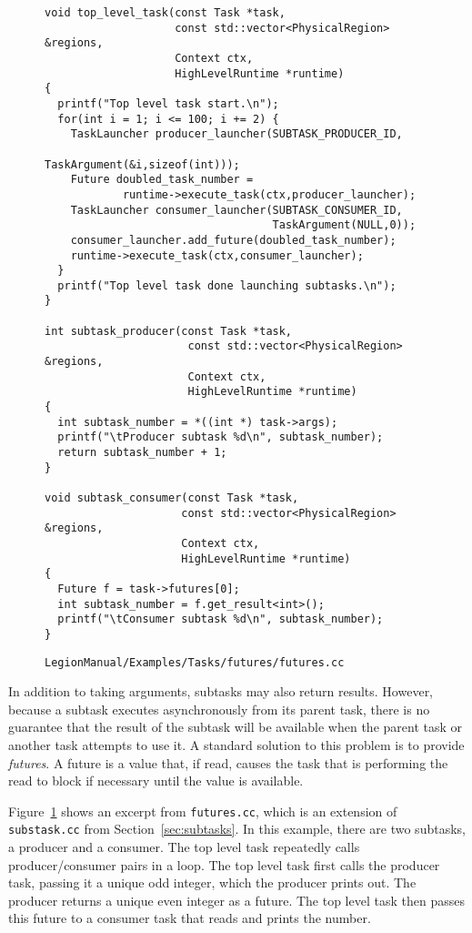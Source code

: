 \documentclass[11pt]{book}
\newcommand{\legionbook}[1]{{\tt LegionManual/Examples/#1}}
\begin{document}
\begin{figure}
\begin{lstlisting}
void top_level_task(const Task *task,
                    const std::vector<PhysicalRegion> &regions,
                    Context ctx,
                    HighLevelRuntime *runtime)
{
  printf("Top level task start.\n");
  for(int i = 1; i <= 100; i += 2) {
    TaskLauncher producer_launcher(SUBTASK_PRODUCER_ID, 
                                   TaskArgument(&i,sizeof(int)));
    Future doubled_task_number =  
            runtime->execute_task(ctx,producer_launcher);
    TaskLauncher consumer_launcher(SUBTASK_CONSUMER_ID, 
                                   TaskArgument(NULL,0));
    consumer_launcher.add_future(doubled_task_number);
    runtime->execute_task(ctx,consumer_launcher);
  }
  printf("Top level task done launching subtasks.\n");
}

int subtask_producer(const Task *task,
                      const std::vector<PhysicalRegion> &regions,
                      Context ctx,
                      HighLevelRuntime *runtime)
{
  int subtask_number = *((int *) task->args);
  printf("\tProducer subtask %d\n", subtask_number);
  return subtask_number + 1;
}

void subtask_consumer(const Task *task,
                     const std::vector<PhysicalRegion> &regions,
                     Context ctx,
                     HighLevelRuntime *runtime)
{
  Future f = task->futures[0];
  int subtask_number = f.get_result<int>();
  printf("\tConsumer subtask %d\n", subtask_number);
}
\end{lstlisting}
\caption{\legionbook{Tasks/futures/futures.cc}}
\label{fig:futures}
\end{figure}

In addition to taking arguments, subtasks may also return results.
However, because a subtask executes asynchronously from its parent
task, there is no guarantee that the result of the subtask will be
available when the parent task or another task attempts to use it.  A
standard solution to this problem is to provide {\em futures}.  A future
is a value that, if read, causes the task that is performing the
read to block if necessary until the value is available.

Figure~\ref{fig:futures} shows an excerpt from {\tt futures.cc}, which
is an extension of {\tt substask.cc} from
Section~\ref{sec:subtasks}.  In this example, there are two subtasks,
a producer and a consumer.  The top level task repeatedly calls
\mbox{producer/consumer} pairs in a loop.  The top level task first calls the
producer task, passing it a unique odd integer, which the producer
prints out.  The producer returns a unique even integer as a future.
The top level task then passes this future to a consumer task that
reads and prints the number.
\end{document}
